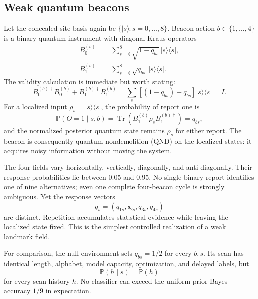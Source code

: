\documentclass[11pt]{article}
\newcommand{\Prob}{\mathbb P}
\newcommand{\Tr}{\operatorname{Tr}}
\begin{document}
\subsection{Weak quantum beacons}

Let the concealed site basis again be
$\{|s\rangle:s=0,\ldots,8\}$. Beacon action $b\in\{1,\ldots,4\}$ is a binary
quantum instrument with diagonal Kraus operators
\begin{align}
 B^{(b)}_0&=\sum_{s=0}^{8}\sqrt{1-q_{bs}}\,
 |s\rangle\langle s|,\\
 B^{(b)}_1&=\sum_{s=0}^{8}\sqrt{q_{bs}}\,
 |s\rangle\langle s|.
 \label{eq:beacon-kraus}
\end{align}
The validity calculation is immediate but worth stating:
\begin{equation}
 B^{(b)\dagger}_0B^{(b)}_0+B^{(b)\dagger}_1B^{(b)}_1
 =\sum_s[(1-q_{bs})+q_{bs}]|s\rangle\langle s|=I.
 \label{eq:beacon-complete}
\end{equation}
For a localized input $\rho_s=|s\rangle\langle s|$, the probability of report
one is
\begin{equation}
 \Prob(O=1\mid s,b)=\Tr(B^{(b)}_1\rho_sB^{(b)\dagger}_1)=q_{bs},
\end{equation}
and the normalized posterior quantum state remains $\rho_s$ for either report.
The beacon is consequently quantum nondemolition (QND) on the localized
states: it acquires noisy information without moving the system.

The four fields vary horizontally, vertically, diagonally, and
anti-diagonally. Their response probabilities lie between 0.05 and 0.95. No
single binary report identifies one of nine alternatives; even one complete
four-beacon cycle is strongly ambiguous. Yet the response vectors
\begin{equation}
 q_s=(q_{1s},q_{2s},q_{3s},q_{4s})
\end{equation}
are distinct. Repetition accumulates statistical evidence while leaving the
localized state fixed. This is the simplest controlled realization of a weak
landmark field.

For comparison, the null environment sets $q_{bs}=1/2$ for every $b,s$. Its
scan has identical length, alphabet, model capacity, optimization, and delayed
labels, but
\begin{equation}
 \Prob(h\mid s)=\Prob(h)
\end{equation}
for every scan history $h$. No classifier can exceed the uniform-prior Bayes
accuracy $1/9$ in expectation.
\end{document}
